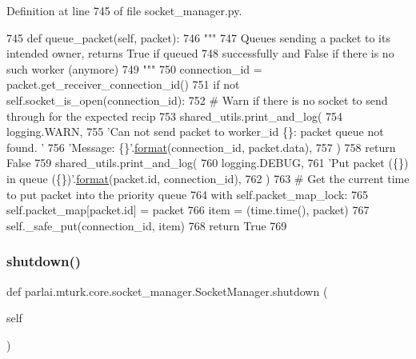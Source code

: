 Definition at line 745 of file socket\+\_\+manager.\+py.


\begin{DoxyCode}
745     \textcolor{keyword}{def }queue\_packet(self, packet):
746         \textcolor{stringliteral}{"""}
747 \textcolor{stringliteral}{        Queues sending a packet to its intended owner, returns True if queued}
748 \textcolor{stringliteral}{        successfully and False if there is no such worker (anymore)}
749 \textcolor{stringliteral}{        """}
750         connection\_id = packet.get\_receiver\_connection\_id()
751         \textcolor{keywordflow}{if} \textcolor{keywordflow}{not} self.socket\_is\_open(connection\_id):
752             \textcolor{comment}{# Warn if there is no socket to send through for the expected recip}
753             shared\_utils.print\_and\_log(
754                 logging.WARN,
755                 \textcolor{stringliteral}{'Can not send packet to worker\_id \{\}: packet queue not found. '}
756                 \textcolor{stringliteral}{'Message: \{\}'}.\hyperlink{namespaceparlai_1_1chat__service_1_1services_1_1messenger_1_1shared__utils_a32e2e2022b824fbaf80c747160b52a76}{format}(connection\_id, packet.data),
757             )
758             \textcolor{keywordflow}{return} \textcolor{keyword}{False}
759         shared\_utils.print\_and\_log(
760             logging.DEBUG,
761             \textcolor{stringliteral}{'Put packet (\{\}) in queue (\{\})'}.\hyperlink{namespaceparlai_1_1chat__service_1_1services_1_1messenger_1_1shared__utils_a32e2e2022b824fbaf80c747160b52a76}{format}(packet.id, connection\_id),
762         )
763         \textcolor{comment}{# Get the current time to put packet into the priority queue}
764         with self.packet\_map\_lock:
765             self.packet\_map[packet.id] = packet
766         item = (time.time(), packet)
767         self.\_safe\_put(connection\_id, item)
768         \textcolor{keywordflow}{return} \textcolor{keyword}{True}
769 
\end{DoxyCode}
\mbox{\label{classparlai_1_1mturk_1_1core_1_1socket__manager_1_1SocketManager_ac98d9330dbc0bcfad53a7a66c09fb56a}} 
\subsubsection{\texorpdfstring{shutdown()}{shutdown()}}
{\footnotesize\ttfamily def parlai.\+mturk.\+core.\+socket\+\_\+manager.\+Socket\+Manager.\+shutdown (\begin{DoxyParamCaption}\item[{}]{self }\end{DoxyParamCaption})}

